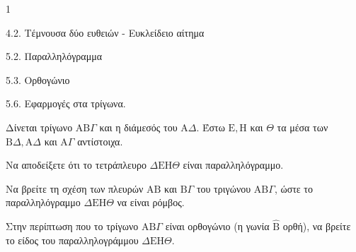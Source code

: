 \begin{ylh}{1}
    \item 4.2. Τέμνουσα δύο ευθειών - Ευκλείδειο αίτημα
    \item 5.2. Παραλληλόγραμμα
    \item 5.3. Ορθογώνιο
    \item 5.6. Εφαρμογές στα τρίγωνα.
\end{ylh}
Δίνεται τρίγωνο $\mathrm{A}\mathrm{B}\Gamma$ και η διάμεσός του $\mathrm{A}\Delta$. Έστω $\mathrm{E}, \mathrm{H}$ και $\Theta$ τα μέσα των $\mathrm{B}\Delta, \mathrm{A}\Delta$ και $\mathrm{A}\Gamma$ αντίστοιχα.
\begin{alist}
    \item Να αποδείξετε ότι το τετράπλευρο $\Delta\mathrm{E}\mathrm{H}\Theta$ είναι παραλληλόγραμμο. 
    \item Να βρείτε τη σχέση των πλευρών $\mathrm{A}\mathrm{B}$ και $\mathrm{B}\Gamma$ του τριγώνου $\mathrm{A}\mathrm{B}\Gamma$, ώστε το παραλληλόγραμμο $\Delta\mathrm{E}\mathrm{H}\Theta$ να είναι ρόμβος. 
    \item Στην περίπτωση που το τρίγωνο $\mathrm{A}\mathrm{B}\Gamma$ είναι ορθογώνιο (η γωνία $\hat{\mathrm{B}}$ ορθή), να βρείτε το είδος του παραλληλογράμμου $\Delta\mathrm{E}\mathrm{H}\Theta$. 
\end{alist}
